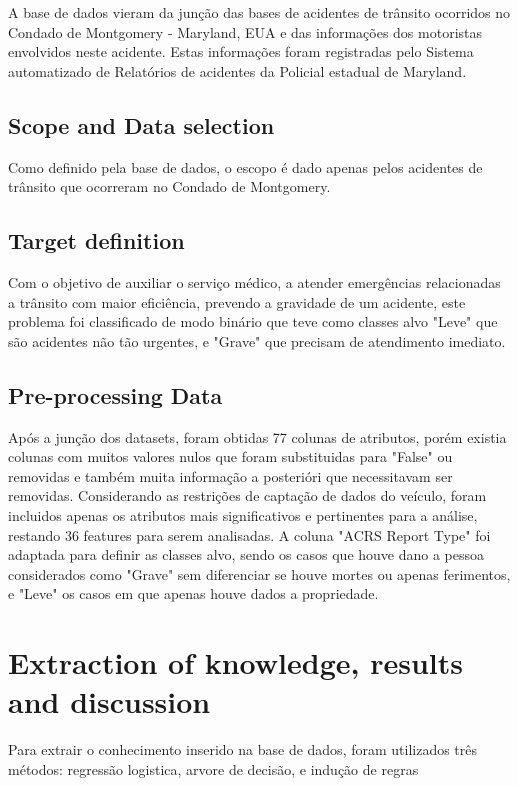 \documentclass[conference]{IEEEtran}
\begin{document}
A base de dados vieram da junção das bases de acidentes de trânsito\cite{incidents}
ocorridos no Condado de Montgomery - Maryland, EUA e das informações dos motoristas envolvidos neste acidente\cite{drivers}.
Estas informações foram registradas pelo Sistema automatizado de Relatórios de acidentes da Policial estadual de Maryland.  

\subsection{Scope and Data selection}
Como definido pela base de dados, o escopo é dado apenas pelos acidentes de trânsito que ocorreram no Condado de Montgomery. 
\subsection{Target definition}
Com o objetivo de auxiliar o serviço médico, a atender emergências relacionadas a trânsito com maior eficiência,
prevendo a gravidade de um acidente, este problema foi classificado de modo binário que teve como classes alvo 
"Leve" que são acidentes não tão urgentes, e "Grave" que precisam de atendimento imediato. 

\subsection{Pre-processing Data}
Após a junção dos datasets, foram obtidas 77 colunas de atributos, porém existia colunas com muitos valores nulos que foram 
substituidas para "False" ou removidas e também muita  informação a posterióri que necessitavam ser removidas.
Considerando as restrições de captação de dados do veículo, foram incluidos apenas os atributos mais significativos e pertinentes para a análise, 
restando 36 features para serem analisadas.
A coluna "ACRS Report Type" foi adaptada para definir as classes alvo, sendo os casos que houve dano a pessoa  considerados como 
"Grave" sem diferenciar se houve mortes ou apenas ferimentos, e "Leve" os casos em que apenas houve dados a propriedade.

\section{Extraction of knowledge, results and discussion}
Para extrair o conhecimento inserido na base de dados, 
foram utilizados três métodos: regressão logistica, arvore de decisão, e indução de regras
\end{document}

